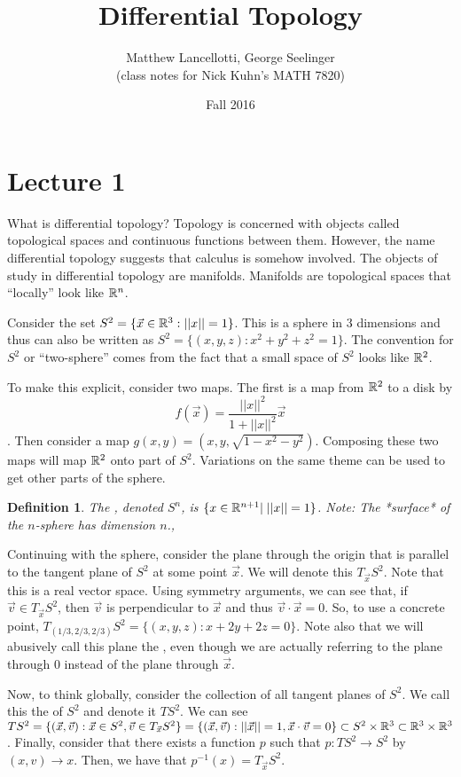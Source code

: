 \documentclass[11pt]{amsbook}
\title[Differential Topology]{Differential Topology}
\author{Matthew Lancellotti, George Seelinger\\ (class notes for Nick Kuhn's MATH 7820)}
\date{Fall 2016}
\theoremstyle{mystyle} \newtheorem{thrm}[thm]{Theorem}
\theoremstyle{mystyle} \newtheorem{defi}[thm]{Definition}
\theoremstyle{mystyle} \newtheorem{coro}[thm]{Corollary}
\theoremstyle{mystyle} \newtheorem{propo}[thm]{Proposition}
\theoremstyle{mystyle} \newtheorem{lemm}[thm]{Lemma}
\numberwithin{thm}{section}
\begin{document}
\maketitle

\section{Lecture 1}

What is differential topology? Topology is concerned with objects called
topological spaces and continuous functions between them. However, the name
differential topology suggests that calculus is somehow involved. The objects of
study in differential topology are manifolds. Manifolds are topological spaces
that ``locally'' look like ${\mathbb R}^n$.
\begin{example}
	Consider the set $S^2 = \{ \vec{x} \in {\mathbb R}^3: ||x||=1\}$. This is a sphere in 3 dimensions and thus can also be written as $S^2 = \{(x,y,z) :
	x^2+y^2+z^2=1\}$. The convention for $S^2$ or ``two-sphere'' comes from the
	fact that a small space of $S^2$ looks like ${\mathbb R}^2$.

	To make this explicit, consider two maps. The first is a map from ${\mathbb R}^2$ to
	a disk by $$f(\vec{x}) = \frac{||x||^2}{1+||x||^2} \vec{x}$$. Then consider a
	map $g(x,y) = (x,y,\sqrt{1-x^2-y^2})$. Composing these two maps will map
	${\mathbb R}^2$ onto part of $S^2$. Variations on the same theme can be used to get
	other parts of the sphere.
\end{example}
\begin{defi}
	The , denoted $S^n$, is $\{x \in {\mathbb R}^{n+1} |\; ||x||=1 \}$. Note: The *surface* of the $n$-sphere has dimension $n$.,
\end{defi}
\begin{example}
	Continuing with the sphere, consider the plane through the origin that is parallel to the tangent plane of $S^2$ at some
	point $\vec{x}$. We will denote this $T_{\vec{x}}S^2$. Note that this is a
	real vector space. Using symmetry arguments, we can see that, if $\vec{v}
	\in T_{\vec{x}}S^2$, then $\vec{v}$ is perpendicular to $\vec{x}$ and thus
	$\vec{v} \cdot \vec{x} = 0$. So, to use a concrete point,
	$T_{(1/3,2/3,2/3)} S^2 = \{(x,y,z) : x+2y+2z=0\}$.  Note also that we will abusively call this plane the , even though we are actually referring to the plane through $0$ instead of the plane through $\vec{x}$.
\end{example}
\begin{example}
	Now, to think globally, consider the collection of all tangent planes of
	$S^2$. We call this the  of $S^2$ and denote it
	$TS^2$. We can see $TS^2 = \{(\vec{x}, \vec{v}): \vec{x} \in S^2, \vec{v}
	\in T_{\vec{x}} S^2\} = \{(\vec{x},\vec{v}) : ||\vec{x}|| = 1, \vec{x}
	\cdot \vec{v} = 0\} \subset S^2 \times {\mathbb R}^3 \subset {\mathbb R}^3 \times {\mathbb R}^3$.
	Finally, consider that there exists a function $p$ such that $p: TS^2 \to
	S^2$ by $(x,v) \to x$. Then, we have that $p^{-1}(x) = T_{\vec{x}}S^2$.
\end{example}
\end{document}
